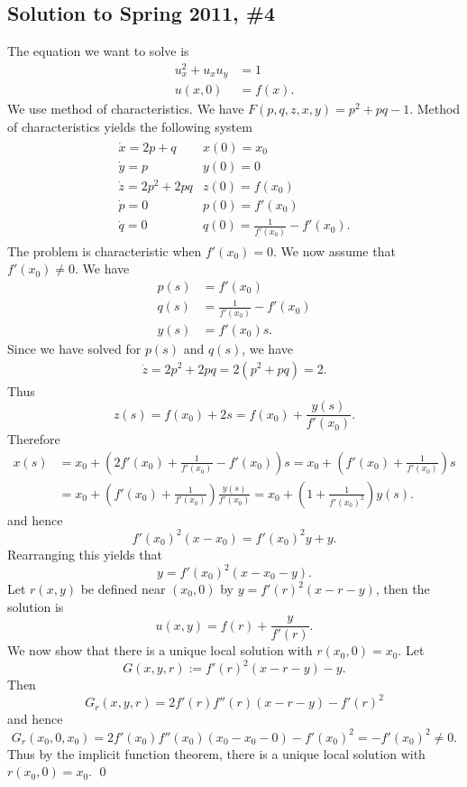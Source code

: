 \subsection*{Solution to Spring 2011, \#4}\label{s114}
The equation we want to solve is
\begin{align*}
u_{x}^{2} + u_{x}u_{y} &= 1\\
u(x, 0) &= f(x).
\end{align*}
We use method of characteristics. We have $F(p, q, z, x, y) = p^{2} + pq - 1$. Method of characteristics yields the following system
\begin{align*}
\begin{array}{ll}
 \dot{x} = 2p + q& x(0) = x_{0} \\
 \dot{y} = p& y(0) = 0\\
 \dot{z} = 2p^{2} + 2pq & z(0) = f(x_{0})\\
 \dot{p} = 0 & p(0) = f'(x_{0})\\
 \dot{q} = 0 & q(0) = \frac{1}{f'(x_{0})} - f'(x_{0}).
\end{array}
\end{align*}
The problem is characteristic when $f'(x_{0}) = 0$. We now assume that $f'(x_{0}) \neq 0$. We have
\begin{align*}
p(s) &= f'(x_{0})\\
q(s) &= \frac{1}{f'(x_{0})} - f'(x_{0})\\
y(s) &= f'(x_{0})s.
\end{align*}
Since we have solved for $p(s)$ and $q(s)$, we have
\begin{align*}
\dot{z} = 2p^{2} + 2pq = 2(p^{2} + pq) = 2.
\end{align*}
Thus
$$z(s) = f(x_{0}) + 2s = f(x_{0}) + \frac{y(s)}{f'(x_{0})}.$$
Therefore
\begin{align*}
x(s) &= x_{0} + (2f'(x_{0}) + \frac{1}{f'(x_{0})} - f'(x_{0}))s = x_{0} + (f'(x_{0}) + \frac{1}{f'(x_{0})})s \\
&= x_{0} + (f'(x_{0}) + \frac{1}{f'(x_{0})})\frac{y(s)}{f'(x_{0})} = x_{0} + (1 + \frac{1}{f'(x_{0})^{2}})y(s).
\end{align*}
and hence
$$f'(x_{0})^{2}(x - x_{0}) = f'(x_{0})^{2}y + y.$$
Rearranging this yields that
$$y = f'(x_{0})^{2}(x - x_{0} - y).$$
Let $r(x, y)$ be defined near $(x_{0}, 0)$ by $y = f'(r)^{2}(x - r - y)$, then the solution is
$$u(x,y) = f(r) + \frac{y}{f'(r)}.$$
We now show that there is a unique local solution with $r(x_{0}, 0) = x_{0}$. Let
$$G(x, y, r) := f'(r)^{2}(x - r - y) - y.$$
Then
$$G_{r}(x, y, r) = 2f'(r)f''(r)(x - r - y) - f'(r)^{2}$$
and hence
$$G_{r}(x_{0}, 0, x_{0}) = 2f'(x_{0})f''(x_{0})(x_{0} - x_{0} - 0) - f'(x_{0})^{2} = -f'(x_{0})^{2} \neq 0.$$
Thus by the implicit function theorem, there is a unique local solution with $r(x_{0}, 0) = x_{0}$.
\hfill\qed

